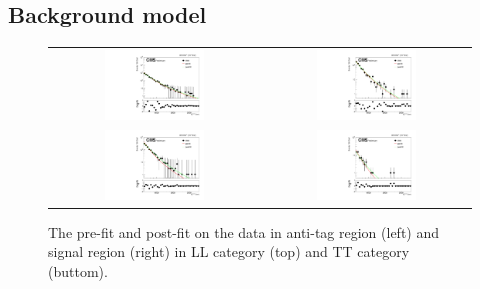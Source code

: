 \begin{itemize}
\subsection{Background model}

\begin{figure}[t]
  \centering
 \begin{tabular}{cc}
    \includegraphics[width=0.5\textwidth]{Figures/aa/anti_LL.pdf} &
   \includegraphics[width=0.5\textwidth]{Figures/aa/data_LL.pdf} \\
   \includegraphics[width=0.5\textwidth]{Figures/aa/anti_TT.pdf} &
   \includegraphics[width=0.5\textwidth]{Figures/aa/data_TT.pdf}
  \end{tabular}
  \caption{The pre-fit and post-fit on the data in anti-tag region (left) and signal region (right) in LL category (top) and TT category (buttom).}
  \label{fig:hvt_brs}
\end{figure}

\end{itemize}